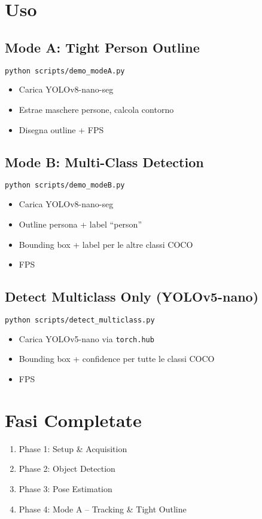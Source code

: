 \documentclass[11pt]{article}
\begin{document}
\section*{Uso}

\subsection*{Mode A: Tight Person Outline}
\begin{lstlisting}[language=bash]
python scripts/demo_modeA.py
\end{lstlisting}
\begin{itemize}
  \item Carica YOLOv8-nano-seg
  \item Estrae maschere persone, calcola contorno
  \item Disegna outline + FPS
\end{itemize}

\subsection*{Mode B: Multi-Class Detection}
\begin{lstlisting}[language=bash]
python scripts/demo_modeB.py
\end{lstlisting}
\begin{itemize}
  \item Carica YOLOv8-nano-seg
  \item Outline persona + label “person”
  \item Bounding box + label per le altre classi COCO
  \item FPS
\end{itemize}

\subsection*{Detect Multiclass Only (YOLOv5-nano)}
\begin{lstlisting}[language=bash]
python scripts/detect_multiclass.py
\end{lstlisting}
\begin{itemize}
  \item Carica YOLOv5-nano via \texttt{torch.hub}
  \item Bounding box + confidence per tutte le classi COCO
  \item FPS
\end{itemize}

\section*{Fasi Completate}
\begin{enumerate}
  \item Phase 1: Setup \& Acquisition
  \item Phase 2: Object Detection
  \item Phase 3: Pose Estimation
  \item Phase 4: Mode A – Tracking \& Tight Outline
\end{enumerate}
\end{document}
